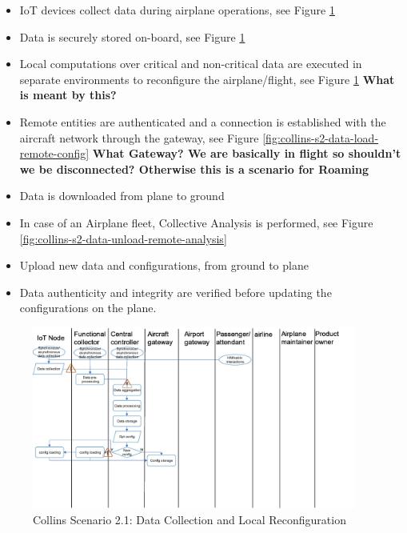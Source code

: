 \begin{itemize}
	\item IoT devices collect data during airplane operations, see Figure \ref{fig:collins-s2-data-collection-reconfig}
	\item Data is securely stored on-board, see Figure \ref{fig:collins-s2-data-collection-reconfig}
	\item Local computations over critical and non-critical data are executed in separate environments to reconfigure
	      the airplane/flight, see Figure \ref{fig:collins-s2-data-collection-reconfig}
	      \textbf{What is meant by this?}
	\item Remote entities are authenticated and a connection is established with the aircraft network through the
	      gateway, see Figure \ref{fig:collins-s2-data-load-remote-config}
	      \textbf{What Gateway? We are basically in flight so shouldn't we be disconnected? Otherwise this is
		      a scenario for Roaming}
	\item Data is downloaded from plane to ground
	\item In case of an Airplane fleet, Collective Analysis is performed, see Figure
	      \ref{fig:collins-s2-data-unload-remote-analysis}
	\item Upload new data and configurations, from ground to plane
	\item Data authenticity and integrity are verified before updating the configurations on the plane.
\end{itemize}

\begin{figure}
	\begin{center}
		\includegraphics[width=0.95\textwidth]{figures/collins-s2-data-collection-reconfig.jpg}
	\end{center}
	\caption{Collins Scenario 2.1: Data Collection and Local Reconfiguration}
	\label{fig:collins-s2-data-collection-reconfig}
\end{figure}

